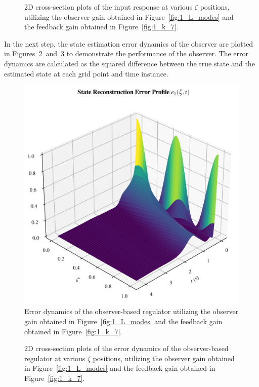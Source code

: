 \begin{figure}[!htbp]
    \centering
    
    \caption{2D cross-section plots of the input response at various $\zeta$ positions, utilizing the observer gain obtained in Figure~\ref{fig:1_L_modes} and the feedback gain obtained in Figure~\ref{fig:1_k_7}.}
    \label{fig:1_2D_xt_L_k7}
\end{figure}

In the next step, the state estimation error dynamics of the observer are plotted in Figures~\ref{fig:1_3D_e1_L_k7}~and~\ref{fig:1_2D_et_L_k7} to demonstrate the performance of the observer. The error dynamics are calculated as the squared difference between the true state and the estimated state at each grid point and time instance.

\begin{figure}[!htbp]
    \centering
    \includegraphics[width=0.8\textwidth%
    ]{papers/1_optimal/figures/3D_e1_L_k7.png}
    \caption{Error dynamics of the observer-based regulator utilizing the observer gain obtained in Figure~\ref{fig:1_L_modes} and the feedback gain obtained in Figure~\ref{fig:1_k_7}.}
    \label{fig:1_3D_e1_L_k7}
\end{figure}

\begin{figure}[!htbp]
    \centering
    
    \caption{2D cross-section plots of the error dynamics of the observer-based regulator at various $\zeta$ positions, utilizing the observer gain obtained in Figure~\ref{fig:1_L_modes} and the feedback gain obtained in Figure~\ref{fig:1_k_7}.}
    \label{fig:1_2D_et_L_k7}
\end{figure}

